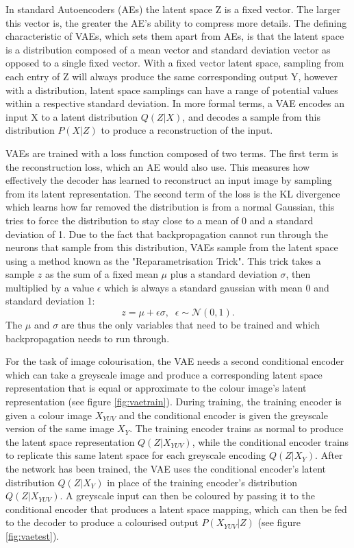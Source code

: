 \documentclass{l4proj}
\begin{document}
In standard Autoencoders (AEs) the latent space Z is a fixed vector. The larger this vector is, the greater the AE's ability to compress more details. The defining characteristic of VAEs, which sets them apart from AEs, is that the latent space is a distribution composed of a mean vector and standard deviation vector as opposed to a single fixed vector. With a fixed vector latent space, sampling from each entry of Z will always produce the same corresponding output Y, however with a distribution, latent space samplings can have a range of potential values within a respective standard deviation. In more formal terms, a VAE encodes an input X to a latent distribution $Q(Z|X)$, and decodes a sample from this distribution $P(X|Z)$ to produce a reconstruction of the input.

VAEs are trained with a loss function composed of two terms. The first term is the reconstruction loss, which an AE would also use. This measures how effectively the decoder has learned to reconstruct an input image by sampling from its latent representation. The second term of the loss is the KL divergence which learns how far removed the distribution is from a normal Gaussian, this tries to force the distribution to stay close to a mean of 0 and a standard deviation of 1. Due to the fact that backpropagation cannot run through the neurons that sample from this distribution, VAEs sample from the latent space using a method known as the "Reparametrisation Trick". This trick takes a sample $z$ as the sum of a fixed mean $\mu$ plus a standard deviation $\sigma$, then multiplied by a value $\epsilon$ which is always a standard gaussian with mean 0 and standard deviation 1:
\begin{equation}\label{eq:reparametrisation_trick}
    z = \mu + \epsilon \sigma, \;\; \epsilon \sim \mathcal{N}(0,1).
\end{equation}
The $\mu$ and $\sigma$ are thus the only variables that need to be trained and which backpropagation needs to run through. 

For the task of image colourisation, the VAE needs a second conditional encoder which can take a greyscale image and produce a corresponding latent space representation that is equal or approximate to the colour image's latent representation (see figure \ref{fig:vaetrain}). During training, the training encoder is given a colour image $X_{YUV}$ and the conditional encoder is given the greyscale version of the same image  $X_{Y}$. The training encoder trains as normal to produce the latent space representation $Q(Z|X_{YUV})$, while the conditional encoder trains to replicate this same latent space for each greyscale encoding $Q(Z|X_{Y})$. After the network has been trained, the VAE uses the conditional encoder's latent distribution $Q(Z|X_{Y})$ in place of the training encoder's distribution $Q(Z|X_{YUV})$. A greyscale input can then be coloured by passing it to the conditional encoder that produces a latent space mapping, which can then be fed to the decoder to produce a colourised output $P(X_{YUV}|Z)$ (see figure \ref{fig:vaetest}).
\end{document}
